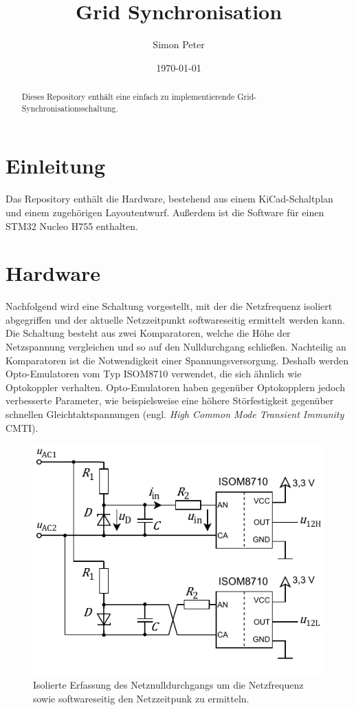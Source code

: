 \documentclass[a4paper,12pt]{article}
\begin{document}
    
    \title{Grid Synchronisation}
    \author{Simon Peter}
    \date{\today}
    \maketitle
    
\begin{abstract}
Dieses Repository enthält eine einfach zu implementierende Grid-Synchronisationsschaltung.
\end{abstract}


\section{Einleitung}
Das Repository enthält die Hardware, bestehend aus einem KiCad-Schaltplan und einem zugehörigen Layoutentwurf. Außerdem ist die Software für einen STM32 Nucleo H755 enthalten.


\section{Hardware}
Nachfolgend wird eine Schaltung vorgestellt, mit der die Netzfrequenz isoliert abgegriffen und der aktuelle Netzzeitpunkt softwareseitig ermittelt werden kann. Die Schaltung besteht aus zwei Komparatoren, welche die Höhe der Netzspannung vergleichen und so auf den Nulldurchgang schließen. Nachteilig an Komparatoren ist die Notwendigkeit einer Spannungsversorgung. Deshalb werden Opto-Emulatoren vom Typ ISOM8710 verwendet, die sich ähnlich wie Optokoppler verhalten. Opto-Emulatoren haben gegenüber Optokopplern jedoch verbesserte Parameter, wie beispielsweise eine höhere Störfestigkeit gegenüber schnellen Gleichtaktspannungen (engl. \textit{High Common Mode Transient Immunity} CMTI).

\begin{figure}[htb]
    \footnotesize
    \centering
    \includegraphics[width=0.65\linewidth]{HwGridSync}
    \caption{Isolierte Erfassung des Netznulldurchgangs um die Netzfrequenz sowie softwareseitig den Netzzeitpunk zu ermitteln.}	
    \label{fig:HwGridSync}
\end{figure}
\end{document}

